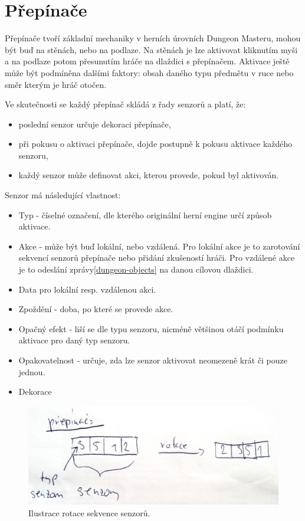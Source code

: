 \section{Přepínače}\label{actuator-analyza}
Přepínače tvoří základní mechaniky v herních úrovních Dungeon Masteru, mohou být buď na stěnách, nebo na podlaze. 
Na stěnách je lze aktivovat kliknutím myši a na podlaze potom přesunutím hráče na dlaždici s přepínačem. Aktivace ještě
může být podmíněna dalšími faktory: obsah daného typu předmětu v ruce nebo směr kterým je hráč otočen.  

Ve skutečnosti se každý přepínač skládá z řady senzorů a platí, že:
\begin{itemize}
\item poslední senzor určuje dekoraci přepínače,
\item při pokusu o aktivaci přepínače, dojde postupně k pokusu aktivace každého senzoru,
\item každý senzor může definovat akci, kterou provede, pokud byl aktivován.
\end{itemize}

Senzor má následující vlastnost:
\begin{itemize}
\item Typ - číselné označení, dle kterého originální herní engine určí způsob aktivace.
\item Akce - může být buď lokální, nebo vzdálená. Pro lokální akce je to zarotování sekvencí senzorů 
	přepínače nebo přidání zkušeností hráči. Pro vzdálené akce je to odeslání zprávy\vref{dungeon-objects} na danou cílovou dlaždici. 
\item Data pro lokální resp. vzdálenou akci.
\item Zpoždění - doba, po které se provede akce.
\item Opačný efekt - liší se dle typu senzoru, nicméně většinou otáčí podmínku aktivace pro daný typ senzoru. 
\item Opakovatelnost - určuje, zda lze senzor aktivovat neomezeně krát či pouze jednou.
\item Dekorace  
\end{itemize}

\begin{figure}[H]\centering
\includegraphics[width=\textwidth]{./img/actuator-rotation.png}
\caption{Ilustrace rotace sekvence senzorů.}
\label{actuator-rotation}
\end{figure}


